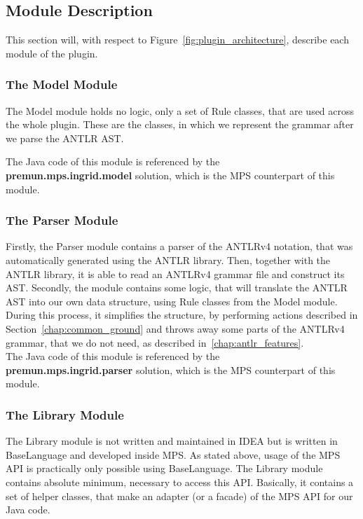 \subsection{Module Description}

This section will, with respect to Figure~\ref{fig:plugin_architecture}, describe each module of the plugin.

\subsubsection{The Model Module}

The Model module holds no logic, only a set of Rule classes, that are used across the whole plugin.
These are the classes, in which we represent the grammar after we parse the ANTLR AST.

The Java code of this module is referenced by the \\\textbf{premun.mps.ingrid.model} solution, which is the MPS counterpart of this module.

\subsubsection{The Parser Module}

Firstly, the Parser module contains a parser of the ANTLRv4 notation, that was automatically generated using the ANTLR library.
Then, together with the ANTLR library, it is able to read an ANTLRv4 grammar file and construct its AST.
Secondly, the module contains some logic, that will translate the ANTLR AST into our own data structure, using Rule classes from the Model module.
During this process, it simplifies the structure, by performing actions described in Section~\ref{chap:common_ground} and throws away some parts of the ANTLRv4 grammar, that we do not need, as described in~\ref{chap:antlr_features}.
\\

The Java code of this module is referenced by the \\\textbf{premun.mps.ingrid.parser} solution, which is the MPS counterpart of this module.

\subsubsection{The Library Module}

The Library module is not written and maintained in IDEA but is written in BaseLanguage and developed inside MPS.
As stated above, usage of the MPS API is practically only possible using BaseLanguage.
The Library module contains absolute minimum, necessary to access this API.
Basically, it contains a set of helper classes, that make an adapter (or a facade) of the MPS API for our Java code.
\\

